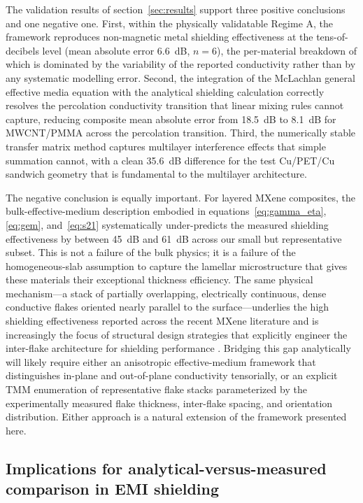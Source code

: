 \documentclass[review,3p,authoryear]{elsarticle}
\begin{document}
The validation results of section~\ref{sec:results} support three positive conclusions and one negative one. First, within the physically validatable Regime A, the framework reproduces non-magnetic metal shielding effectiveness at the tens-of-decibels level (mean absolute error \SI{6.6}{dB}, $n = 6$), the per-material breakdown of which is dominated by the variability of the reported conductivity rather than by any systematic modelling error. Second, the integration of the McLachlan general effective media equation with the analytical shielding calculation correctly resolves the percolation conductivity transition that linear mixing rules cannot capture, reducing composite mean absolute error from \SI{18.5}{dB} to \SI{8.1}{dB} for MWCNT/PMMA across the percolation transition. Third, the numerically stable transfer matrix method captures multilayer interference effects that simple summation cannot, with a clean \SI{35.6}{dB} difference for the test Cu/PET/Cu sandwich geometry that is fundamental to the multilayer architecture.

The negative conclusion is equally important. For layered MXene composites, the bulk-effective-medium description embodied in equations~\eqref{eq:gamma_eta}, \eqref{eq:gem}, and~\eqref{eq:s21} systematically under-predicts the measured shielding effectiveness by between \SI{45}{dB} and \SI{61}{dB} across our small but representative subset. This is not a failure of the bulk physics; it is a failure of the homogeneous-slab assumption to capture the lamellar microstructure that gives these materials their exceptional thickness efficiency. The same physical mechanism---a stack of partially overlapping, electrically continuous, dense conductive flakes oriented nearly parallel to the surface---underlies the high shielding effectiveness reported across the recent MXene literature \citep{Shahzad2016, Iqbal2020, Han2020, Hu2026Small} and is increasingly the focus of structural design strategies that explicitly engineer the inter-flake architecture for shielding performance \citep{Wang2025NanoscaleAdv}. Bridging this gap analytically will likely require either an anisotropic effective-medium framework that distinguishes in-plane and out-of-plane conductivity tensorially, or an explicit TMM enumeration of representative flake stacks parameterized by the experimentally measured flake thickness, inter-flake spacing, and orientation distribution. Either approach is a natural extension of the framework presented here.

\subsection{Implications for analytical-versus-measured comparison in EMI shielding}
\end{document}
